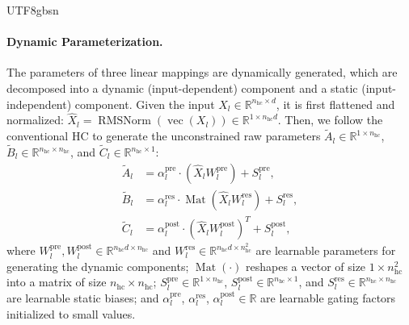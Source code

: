 \begin{CJK*}{UTF8}{gbsn}
\paragraph{Dynamic Parameterization.}
The parameters of three linear mappings are dynamically generated, which are decomposed into a dynamic (input-dependent) component and a static (input-independent) component. 
Given the input $X_l \in \mathbb{R}^{n_{\text{hc}} \times d}$, it is first flattened and normalized: $\hat{X}_l = \operatorname{RMSNorm}(\operatorname{vec}(X_l)) \in \mathbb{R}^{1 \times n_{\text{hc}}d}$. 
Then, we follow the conventional HC to generate the unconstrained raw parameters $\tilde{A}_l \in \mathbb{R}^{1 \times n_{\text{hc}}}$, $\tilde{B}_l \in \mathbb{R}^{n_{\text{hc}} \times n_{\text{hc}}}$, and $\tilde{C}_l \in \mathbb{R}^{n_{\text{hc}} \times 1}$:
\begin{align}
    \tilde{A}_l &= \alpha_l^\mathrm{pre} \cdot (\hat{X}_l W^\mathrm{pre}_l) + S_l^\mathrm{pre}, \\
    \tilde{B}_l &= \alpha_l^\mathrm{res} \cdot \operatorname{Mat}(\hat{X}_l W^\mathrm{res}_l) + S_l^\mathrm{res}, \\
    \tilde{C}_l &= \alpha_l^\mathrm{post} \cdot (\hat{X}_l W^\mathrm{post}_l)^T + S_l^\mathrm{post},
\end{align}
where $W^\mathrm{pre}_l, W^\mathrm{post}_l \in \mathbb{R}^{n_{\text{hc}}d \times n_{\text{hc}}}$ and $W^\mathrm{res}_l \in \mathbb{R}^{n_{\text{hc}}d \times n_{\text{hc}}^2}$ are learnable parameters for generating the dynamic components;
$\operatorname{Mat}(\cdot)$ reshapes a vector of size $1 \times n_{\text{hc}}^2$ into a matrix of size $n_{\text{hc}} \times n_{\text{hc}}$; 
$S_l^\mathrm{pre} \in \mathbb{R}^{1 \times n_{\text{hc}}}$, $S_l^\mathrm{post} \in \mathbb{R}^{n_{\text{hc}}\times 1}$, and $S_l^\mathrm{res} \in \mathbb{R}^{n_{\text{hc}} \times n_{\text{hc}}}$ are learnable static biases; 
and $\alpha_l^\mathrm{pre}$, $\alpha_l^\mathrm{res}$, $\alpha_l^\mathrm{post} \in \mathbb{R}$ are learnable gating factors initialized to small values. 


\end{CJK*}
